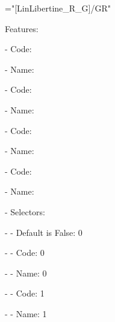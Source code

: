 \font\g="[LinLibertine_R_G]/GR"

Features: \the\XeTeXcountfeatures \g

- Code: \the\XeTeXfeaturecode {}

- Name: \XeTeXfeaturename {}

- Code: \the\XeTeXfeaturecode {}

- Name: \XeTeXfeaturename {}

- Code: \the\XeTeXfeaturecode {}

- Name: \XeTeXfeaturename {}

- Code: \the\XeTeXfeaturecode {}

- Name: \XeTeXfeaturename {}

- Selectors: \the\XeTeXcountselectors {}

- - Default is False: \the\XeTeXisdefaultselector {} 0

- - Code: \the\XeTeXselectorcode {} 0

- - Name: \XeTeXselectorname {} 0

- - Code: \the\XeTeXselectorcode {} 1

- - Name: \XeTeXselectorname {} 1

\bye
